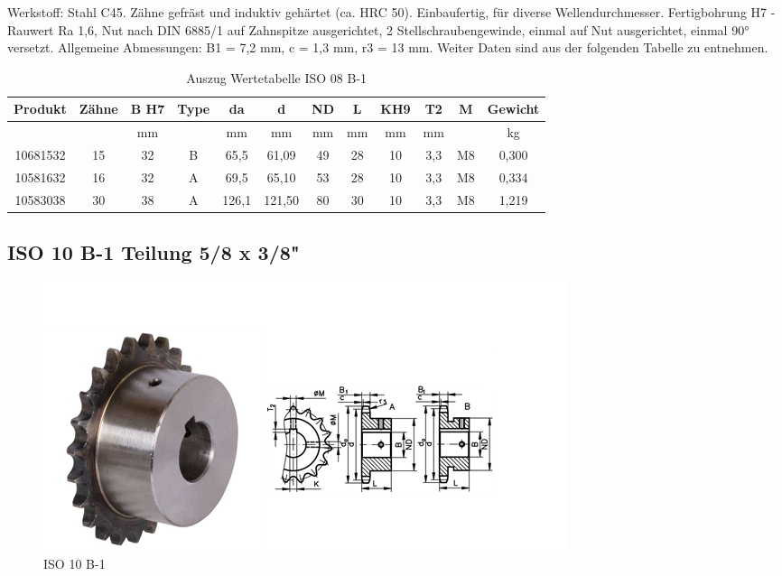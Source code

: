 Werkstoff: Stahl C45. Zähne gefräst und induktiv gehärtet (ca. HRC 50). Einbaufertig, für diverse Wellendurchmesser. Fertigbohrung H7 -Rauwert Ra 1,6, Nut nach DIN 6885/1 auf Zahnspitze ausgerichtet, 2 Stellschraubengewinde, einmal auf Nut ausgerichtet, einmal 90° versetzt. Allgemeine Abmessungen: B1 = 7,2 mm, c = 1,3 mm, r3 = 13 mm. 
Weiter Daten sind aus der folgenden Tabelle zu entnehmen.

\begin{table}[H]
	\begin{tabular}{|c|c|c|c|c|c|c|c|c|c|c|c|}
	\hline
		\textbf{Produkt} & \textbf{Zähne} & \textbf{B H7} & \textbf{Type} & \textbf{da} & \textbf{d} & \textbf{ND} & \textbf{L} & \textbf{KH9} & \textbf{T2} & \textbf{M} & \textbf{Gewicht} \\ \hline
		                 & \textbf{}                 & mm                           &               & mm          & mm         & mm          & mm         & mm           & mm          &            & kg               \\ \hline
		10681532         & 15                        & 32                           & B             & 65,5        & 61,09      & 49          & 28         & 10           & 3,3         & M8         & 0,300            \\ \hline
		10581632         & 16                        & 32                           & A             & 69,5        & 65,10      & 53          & 28         & 10           & 3,3         & M8         & 0,334            \\ \hline
		10583038         & 30                        & 38                           & A             & 126,1       & 121,50     & 80          & 30         & 10           & 3,3         & M8         & 1,219            \\ \hline
	\end{tabular}
	\caption{Auszug Wertetabelle ISO 08 B-1}
\end{table}

\newpage

\subsection*{ISO 10 B-1 Teilung 5/8 x 3/8"}

\begin{figure} [H]
	\begin{center}
		\includegraphics[scale=0.7]{figures/mechanik/ISO 10 B-1 .PNG}
			\caption{ISO 10 B-1}
			\label{fig:ISO 10 B-1}
	\end{center}
\end{figure}

